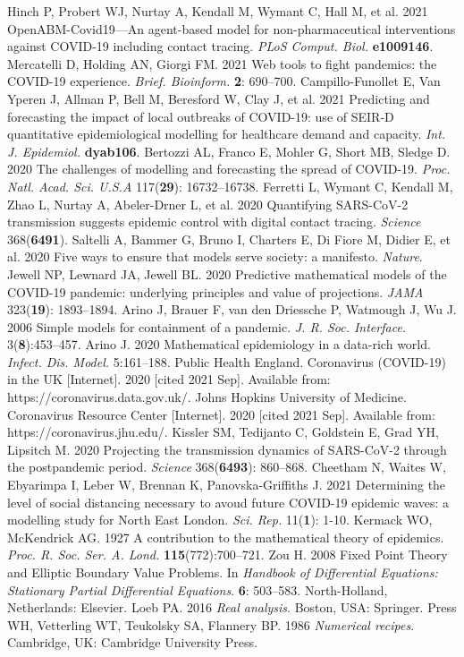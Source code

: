 \documentclass{article}
\begin{document}
\begin{thebibliography}{9}
 Hinch P, Probert WJ, Nurtay A, Kendall M, Wymant C, Hall M, et al. 2021 OpenABM-Covid19—An agent-based model for non-pharmaceutical interventions against COVID-19 including contact tracing. \textit{PLoS Comput. Biol.} \textbf{e1009146}.
 Mercatelli D, Holding AN, Giorgi FM. 2021 Web tools to fight pandemics: the COVID-19 experience. \textit{Brief. Bioinform.} \textbf{2}: 690--700. 
 Campillo-Funollet E, Van Yperen J, Allman P, Bell M, Beresford W, Clay J, et al. 2021 Predicting and forecasting the impact of local outbreaks of COVID-19: use of SEIR-D quantitative epidemiological modelling for healthcare demand and capacity. \textit{Int. J. Epidemiol.} \textbf{dyab106}. 
 Bertozzi AL, Franco E, Mohler G, Short MB, Sledge D. 2020 The challenges of modelling and forecasting the spread of COVID-19. \textit{Proc. Natl. Acad. Sci. U.S.A} 117(\textbf{29}): 16732--16738.
 Ferretti L, Wymant C, Kendall M, Zhao L, Nurtay A, Abeler-Drner L, et al. 2020 Quantifying SARS-CoV-2 transmission suggests epidemic control with digital contact tracing. \textit{Science} 368(\textbf{6491}). 
 Saltelli A, Bammer G, Bruno I, Charters E, Di Fiore M, Didier E, et al. 2020 Five ways to ensure that models serve society: a manifesto. \textit{Nature}. 
 Jewell NP, Lewnard JA, Jewell BL. 2020 Predictive mathematical models of the COVID-19 pandemic: underlying principles and value of projections. \textit{JAMA} 323(\textbf{19}): 1893--1894.   
 Arino J, Brauer F, van den Driessche P, Watmough J, Wu J. 2006 Simple models for containment of a pandemic. \textit{J. R. Soc. Interface.} 3(\textbf{8}):453--457.
 Arino J. 2020 Mathematical epidemiology in a data-rich world. \textit{Infect. Dis. Model.} 5:161--188. 
 Public Health England. Coronavirus (COVID-19) in the UK [Internet]. 2020 [cited 2021 Sep]. Available from: https://coronavirus.data.gov.uk/. 
 Johns Hopkins University of Medicine. Coronavirus Resource Center [Internet]. 2020 [cited 2021 Sep]. Available from: https://coronavirus.jhu.edu/. 
 Kissler SM, Tedijanto C, Goldstein E, Grad YH, Lipsitch M. 2020 Projecting the transmission dynamics of SARS-CoV-2 through the postpandemic period. \textit{Science} 368(\textbf{6493}): 860--868.
 Cheetham N, Waites W, Ebyarimpa I, Leber W, Brennan K, Panovska-Griffiths J. 2021 Determining the level of social distancing necessary to avoud future COVID-19 epidemic waves: a modelling study  for North East London. \textit{Sci. Rep.} 11(\textbf{1}): 1-10.
 Kermack WO, McKendrick AG. 1927 A contribution to the mathematical theory of epidemics. \textit{Proc. R. Soc. Ser. A. Lond.} \textbf{115}(772):700--721. 
 Zou H. 2008 Fixed Point Theory and Elliptic Boundary Value Problems. In \textit{Handbook of Differential Equations: Stationary Partial Differential Equations}. \textbf{6}: 503--583. North-Holland, Netherlands: Elsevier.
 Loeb PA. 2016 \textit{Real analysis}. Boston, USA: Springer. 
 Press WH, Vetterling WT, Teukolsky SA, Flannery BP. 1986 \textit{Numerical recipes}. Cambridge, UK: Cambridge University Press. 

\end{thebibliography}
\end{document}
